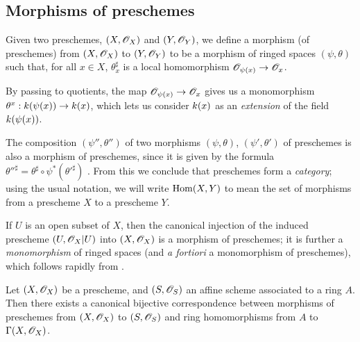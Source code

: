 \subsection{Morphisms of preschemes}
\label{subsection-prescheme-morphisms}

\begin{defn}[2.2.1]
\label{1.2.2.1}
Given two preschemes, $(X,\mathscr{O}_X)$ and $(Y,\mathscr{O}_Y)$, we define a morphism (of preschemes) from $(X,\mathscr{O}_X)$ to $(Y,\mathscr{O}_Y)$ to be a morphism of ringed spaces $(\psi,\theta)$ such that, for all $x\in X$, $\theta_x^\sharp$ is a local homomorphism $\OO_{\psi(x)}\to\OO_x$.
\end{defn}

By passing to quotients, the map $\OO_{\psi(x)}\to\OO_x$ gives us a monomorphism $\theta^x:\kres(\psi(x))\to\kres(x)$, which lets us consider $k(x)$ as an \emph{extension} of the field $k(\psi(x))$.

\begin{env}[2.2.2]
\label{1.2.2.2}
The composition $(\psi'',\theta'')$ of two morphisms $(\psi,\theta)$, $(\psi',\theta')$ of preschemes is also a morphism of preschemes, since it is given by the formula ${\theta''}^\sharp=\theta^\sharp\circ\psi^*({\theta'}^\sharp)$ .
From this we conclude that preschemes form a \emph{category};
using the usual notation, we will write ${\mathop{\mathrm{Hom}}\nolimits}(X,Y)$ to mean the set of morphisms from a prescheme $X$ to a prescheme $Y$.
\end{env}

\begin{exm}[2.2.3]
\label{1.2.2.3}
If $U$ is an open subset of $X$, then the canonical injection  of the induced prescheme $(U,\mathscr{O}_X|U)$ into $(X,\mathscr{O}_X)$ is a morphism of preschemes;
it is further a \emph{monomorphism} of ringed spaces (and \emph{a fortiori} a monomorphism of preschemes), which follows rapidly from .
\end{exm}

\begin{prop}[2.2.4]
\label{1.2.2.4}
Let $(X,\mathscr{O}_X)$ be a prescheme, and $(S,\mathscr{O}_S)$ an affine scheme associated to a ring $A$.
Then there exists a canonical bijective correspondence between morphisms of preschemes from $(X,\mathscr{O}_X)$ to $(S,\mathscr{O}_S)$ and ring homomorphisms from $A$ to $\Gamma(X,\mathscr{O}_X)$.
\end{prop}

